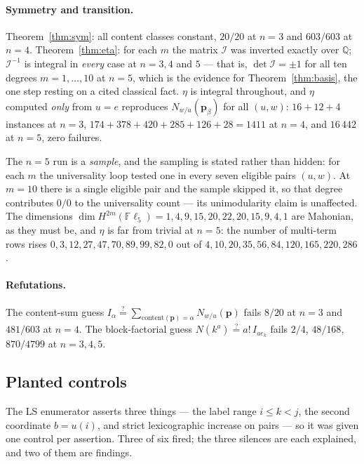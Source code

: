 \documentclass[11pt]{article}
\theoremstyle{plain}
\theoremstyle{definition}
\newcommand{\Fl}{\mathbb{F}\ell}
\newcommand{\pv}{\mathbf{p}}
\begin{document}
\paragraph{Symmetry and transition.} Theorem~\ref{thm:sym}: all content classes
constant, $20/20$ at $n=3$ and $603/603$ at $n=4$. Theorem~\ref{thm:eta}: for
each $m$ the matrix $\mathcal{I}$ was inverted exactly over $\mathbb{Q}$;
$\mathcal{I}^{-1}$ is integral in \emph{every} case at $n=3,4$ and $5$ --- that
is, $\det\mathcal{I}=\pm1$ for all ten degrees $m=1,\dots,10$ at $n=5$, which
is the evidence for Theorem~\ref{thm:basis}, the one step resting on a cited
classical fact. $\eta$ is integral throughout, and $\eta$ computed \emph{only}
from $u=e$ reproduces $N_{w/u}(\pv_\beta)$ for all $(u,w)$: $16+12+4$ instances
at $n=3$, $174+378+420+285+126+28=1411$ at $n=4$, and $16\,442$ at $n=5$, zero
failures.

The $n=5$ run is a \emph{sample}, and the sampling is stated rather than
hidden: for each $m$ the universality loop tested one in every seven eligible
pairs $(u,w)$. At $m=10$ there is a single eligible pair and the sample skipped
it, so that degree contributes $0/0$ to the universality count --- its
unimodularity claim is unaffected. The dimensions
$\dim H^{2m}(\Fl_5)=1,4,9,15,20,22,20,15,9,4,1$ are Mahonian, as they must be,
and $\eta$ is far from trivial at $n=5$: the number of multi-term rows rises
$0,3,12,27,47,70,89,99,82,0$ out of $4,10,20,35,56,84,120,165,220,286$.

\paragraph{Refutations.} The content-sum guess
$I_\alpha\overset{?}{=}\sum_{\mathrm{content}(\pv)=\alpha}N_{w/u}(\pv)$ fails
$8/20$ at $n=3$ and $481/603$ at $n=4$. The block-factorial guess
$N(k^a)\overset{?}{=}a!\,I_{ae_k}$ fails $2/4$, $48/168$, $870/4799$ at
$n=3,4,5$.

\subsection{Planted controls}\label{sec:controls}

The LS enumerator asserts three things --- the label range $i\le k<j$, the
second coordinate $b=u(i)$, and strict lexicographic increase on pairs --- so it
was given one control per assertion. Three of six fired; the three silences are
each explained, and two of them are findings.
\end{document}
